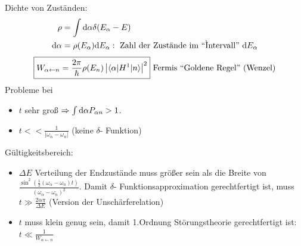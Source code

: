 	Dichte von Zuständen:
		\begin{align*}
			\rho &= \int \mathrm{d} \alpha \delta (E_\alpha - E)  \\
			\mathrm{d} \alpha &= \rho(E_\alpha) \mathrm{d} E_\alpha: \text{~Zahl der Zustände im ``Ìntervall''~} \mathrm{d} E_\alpha
		\end{align*}
		\begin{align*}
			\boxed{
				W_{\alpha \leftarrow n} = \frac{2 \pi}{\hbar} \rho(E_n)
					\left| \braket{\alpha | H^1 | n}\right|^2
				}
			\text{~Fermis ``Goldene Regel'' (Wenzel)}
		\end{align*}
	Probleme bei 
		\begin{itemize}
			\item $t$ sehr groß $\Rightarrow \int \mathrm{d} \alpha P_{\alpha n} > 1$.
			\item $t  << \frac{1}{|\omega_\alpha - \omega_n|}$ (keine $\delta$- Funktion)   
		\end{itemize}	
	Gültigkeitsbereich:
		\begin{itemize}
			\item $\Delta E$ Verteilung der Endzustände muss größer sein als die Breite von $\frac{\sin^2 (\frac{1}{2}(\omega_\alpha - \omega_n) t)}{(\omega_\alpha - \omega_n)^2}$. Damit $\delta$- Funktionsapproximation gerechtfertigt ist, muss $t \gg \frac{2 \alpha \pi}{\Delta E}$ (Version der Unschärferelation)
			\item $t$ muss klein genug sein, damit 1.Ordnung Störungstheorie gerechtfertigt ist:
			\\ $t \ll \frac{1}{W_{\alpha \leftarrow n}}$
		\end{itemize}
		
